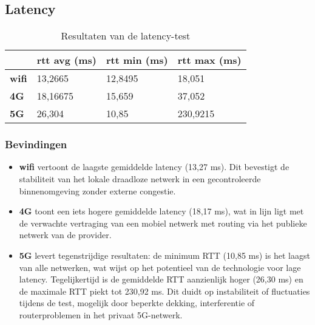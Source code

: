 \subsection{Latency}
\begin{table}[]
    
    \caption{Resultaten van de latency-test} \label{tab:latency}
    
        \begin{tabular}{l l l l}
            \cline{2-4}
            & \textbf{rtt avg (ms)} & \textbf{rtt min (ms)} & \textbf{rtt max (ms)} \\ \hline
            \multicolumn{1}{l}{\textbf{wifi}} & 13,2665          & 12,8495          & 18,051           \\ \hline
            \multicolumn{1}{l}{\textbf{4G}}   & 18,16675         & 15,659           & 37,052           \\ \hline            
            \multicolumn{1}{l}{\textbf{5G}}   & 26,304           & 10,85            & 230,9215         \\ \hline
        \end{tabular}
        
    
\end{table}

\subsubsection{Bevindingen}
\begin{itemize}
    \item \textbf{wifi} vertoont de laagste gemiddelde latency (13,27 ms). Dit bevestigt de stabiliteit van het lokale draadloze netwerk in een gecontroleerde binnenomgeving zonder externe congestie.
    
    \item \textbf{4G} toont een iets hogere gemiddelde latency (18,17 ms), wat in lijn ligt met de verwachte vertraging van een mobiel netwerk met routing via het publieke netwerk van de provider.
    
    \item \textbf{5G} levert tegenstrijdige resultaten: de minimum RTT (10,85 ms) is het laagst van alle netwerken, wat wijst op het potentieel van de technologie voor lage latency. Tegelijkertijd is de gemiddelde RTT aanzienlijk hoger (26,30 ms) en de maximale RTT piekt tot 230,92 ms. Dit duidt op instabiliteit of fluctuaties tijdens de test, mogelijk door beperkte dekking, interferentie of routerproblemen in het privaat 5G-netwerk.
\end{itemize}

